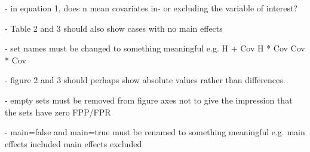 - in equation 1, does n mean covariates in- or excluding the variable of interest?

- Table 2 and 3 should also show cases with no main effects

- set names must be changed to something meaningful e.g.
H + Cov
H * Cov
Cov * Cov

- figure 2 and 3 should perhaps show absolute values rather than differences. 

- empty sets must be removed from figure axes not to give the impression that the sets have zero FPP/FPR

- main=false and main=true must be renamed to something meaningful e.g.
 main effects included
main effects excluded